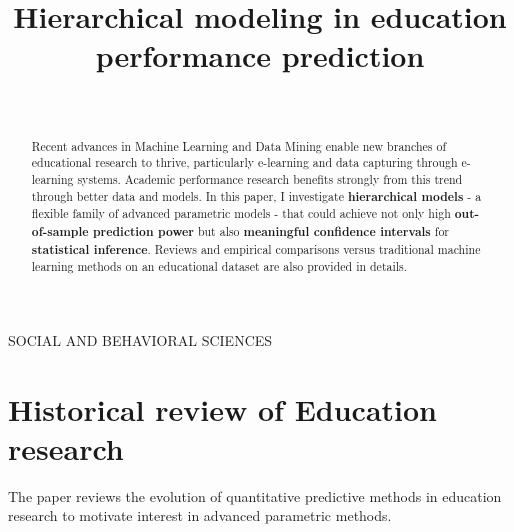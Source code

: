 \documentclass{sigchi}
\def\plaintitle{Hierarchical modeling in education performance prediction}
\begin{document}
\title{\plaintitle}

\author{%
  \\
}


\maketitle

\begin{abstract}
  Recent advances in Machine Learning and Data Mining enable new
  branches of educational research to thrive, particularly e-learning and data
  capturing through e-learning systems. \cite{romero2010educational}
  Academic performance research benefits strongly from this trend
  through better data and models. In this paper,
  I investigate \textbf{hierarchical models} - a flexible family of advanced
  parametric models - that could achieve not only high \textbf{out-of-sample prediction
  power} but also \textbf{meaningful confidence intervals} for \textbf{statistical
  inference}. Reviews and empirical comparisons versus traditional machine
  learning methods on an educational dataset are also provided in details.
  
\end{abstract}

 
{SOCIAL AND BEHAVIORAL SCIENCES}  


\section{Historical review of Education research}
The paper reviews the evolution of quantitative predictive methods in
education research to motivate interest in advanced parametric methods.
\end{document}
